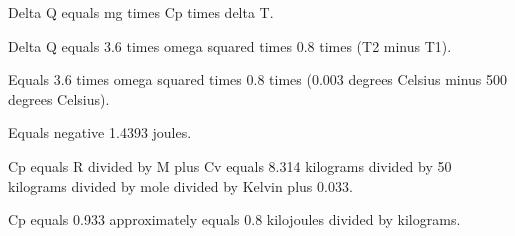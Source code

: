 Delta Q equals mg times Cp times delta T.

Delta Q equals 3.6 times omega squared times 0.8 times (T2 minus T1).

Equals 3.6 times omega squared times 0.8 times (0.003 degrees Celsius minus 500 degrees Celsius).

Equals negative 1.4393 joules.

Cp equals R divided by M plus Cv equals 8.314 kilograms divided by 50 kilograms divided by mole divided by Kelvin plus 0.033.

Cp equals 0.933 approximately equals 0.8 kilojoules divided by kilograms.